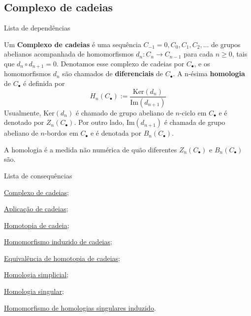 \subsection{Complexo de cadeias}
\label{complexo-de-cadeias-def}
\begin{titlemize}{Lista de dependências}
	\item %
\end{titlemize}
\begin{defi}
	Um \textbf{Complexo de cadeias} é uma sequência $C_{-1}=0,C_0,C_1, C_2,...$ de grupos abelianos acompanhada de homomorfismos $d_n:C_n\rightarrow C_{n-1}$ para cada $n\ge 0$, tais que $d_{n}\circ d_{n+1}=0$. Denotamos esse complexo de cadeias por $C_{\bullet}$, e os homomorfismos $d_n$ são chamados de \textbf{diferenciais} de $C_\bullet$. A n-ésima \textbf{homologia} de $C_\bullet$ é definida por
    \[H_n(C_\bullet):=\frac{\text{Ker}(d_n)}{\text{Im}(d_{n+1})}\]
    Usualmente, $\text{Ker}(d_n)$ é chamado de grupo abeliano de $n$-ciclo em $C_\bullet$ e é denotado por $Z_n(C_\bullet)$. Por outro lado, $\text{Im}(d_{n+1})$ é chamada de grupo abeliano de $n$-bordos em $C_\bullet$ e é denotada por $B_n(C_\bullet)$.
\end{defi}

A homologia é a medida não numérica de quão diferentes $Z_n(C_\bullet)$ e $B_n(C_\bullet)$ são.

\begin{titlemize}{Lista de consequências}
	\item \hyperref[complexo-de-cadeias-def]{Complexo de cadeias};\\ 
    \item \hyperref[aplicacao-de-cadeias-def]{Aplicação de cadeias};\\
    \item \hyperref[homotopia-de-cadeias-def]{Homotopia de cadeia};\\
    \item \hyperref[homomorfismo-induzido-de-cadeias-prop]{Homomorfismo induzido de cadeias};\\
    \item \hyperref[equivalencia-de-homotopia-de-cadeias-def]{Equivalência de homotopia de cadeias};\\
    \item \hyperlink{homologia-simplicial-def}{Homologia simplicial};\\
    \item \hyperref[homologia-singular-def]{Homologia singular};\\
    \item \hyperref[homomorfismo-de-homologias-singulares-induzido-prop]{Homomorfismo de homologias singulares induzido}.
\end{titlemize}
